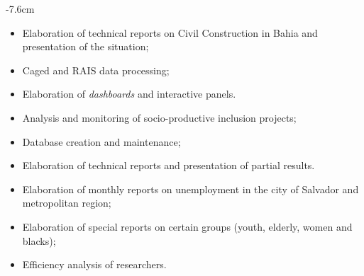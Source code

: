 \documentclass[10pt,a4paper]{curriculo}
\begin{document}
\tagline{}

\begin{adjustwidth}{}{-7.6cm}
\makecvheader
\end{adjustwidth}




\begin{itemize}
\item Elaboration of technical reports on Civil Construction in Bahia and presentation of the situation;
\item Caged and RAIS data processing;
\item Elaboration of \textit{dashboards} and interactive panels.
\end{itemize}

\divider

\begin{itemize}
\item Analysis and monitoring of socio-productive inclusion projects;
\item Database creation and maintenance;
\item Elaboration of technical reports and presentation of partial results.
\end{itemize}

\divider

\begin{itemize}
	\item Elaboration of monthly reports on unemployment in the city of Salvador and metropolitan region;
	\item Elaboration of special reports on certain groups (youth, elderly, women and blacks);
	\item Efficiency analysis of researchers.
\end{itemize}
\end{document}

